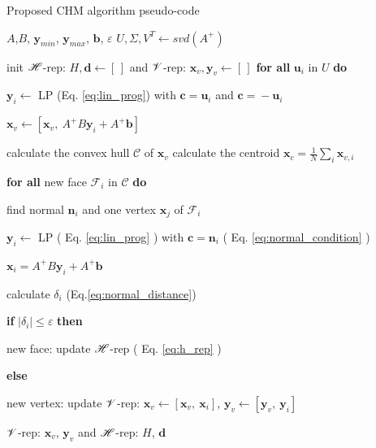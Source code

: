 \begin{algorithm}[!b]
\caption{Proposed CHM algorithm pseudo-code}
\begin{algorithmic}
\REQUIRE $A$,$B$, $\bm{y}_{min}$, $\bm{y}_{max}$, $\bm{b}$, $\varepsilon$
\STATE $U, \Sigma, V^T \leftarrow svd(A^+)$ 

\STATE init $\mathscr{H}$-rep: $H,\bm{d} \leftarrow [\,]$ and $\mathscr{V}$-rep: $\bm{x}_v,\bm{y}_v\leftarrow [\,]$
\STATE \textbf{for all}   {$\bm{u}_i$ in $U$} \textbf{do}

\hspace{0.3cm} $\bm{y}_{i}\leftarrow$ LP (Eq. \ref{eq:lin_prog}) with $\bm{c}\! =\! \bm{u}_i$ and $\bm{c}\! =\! -\bm{u}_i$

\hspace{0.3cm} $\bm{x}_{v} \leftarrow [\bm{x}_{v}, ~ A^+B\bm{y}_i + A^+\bm{b}]$

\REPEAT

\STATE calculate the convex hull $\mathcal{C}$ of $\bm{x}_{v}$
\STATE calculate the centroid $\bm{x}_{c} = \frac{1}{N}\sum_i\bm{x}_{v,i}$

\STATE \textbf{for all}   {new face $\mathcal{F}_i$ in $\mathcal{C}$} \textbf{do}

\hspace{0.25cm} find normal $\bm{n}_i$ and one vertex $\bm{x}_{j}$ of $\mathcal{F}_i$

\hspace{0.25cm} $\bm{y}_{i}\leftarrow$ LP ( Eq. \ref{eq:lin_prog} ) with  $\bm{c}\! =\! \bm{n}_i$ ( Eq. \ref{eq:normal_condition} )

\hspace{0.25cm} $\bm{x}_{i} = A^+B\bm{y}_i+A^+\bm{b}$ 

\hspace{0.25cm}  calculate $\delta_i$ (Eq.\ref{eq:normal_distance})

\hspace{0.25cm}  \textbf{if}   $ |\delta_i| \leq \varepsilon$ \textbf{then} 

\hspace{0.6cm}  new face: update $\mathscr{H}$-rep  ( Eq. \ref{eq:h_rep} )

\hspace{0.25cm}  \textbf{else}

\hspace{0.6cm} new vertex: update $\mathscr{V}$-rep: $\bm{x}_{v} \!\leftarrow\! [\bm{x}_{v},~ \bm{x}_i ]$,  $\bm{y}_{v} \!\leftarrow\! [\bm{y}_{v},~ \bm{y}_i ]$ 

{}
\RETURN  $\mathscr{V}$-rep: $\bm{x}_v$, $\bm{y}_v$ and  $\mathscr{H}$-rep: $H$, $\bm{d}$ 
\end{algorithmic}
\label{alg:algo_2}
\end{algorithm}

